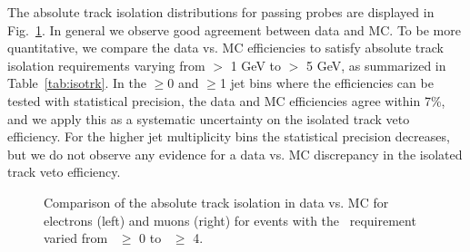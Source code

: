 The absolute track isolation distributions for passing probes are displayed in Fig.~\ref{fig:tnp}. In general we observe
good agreement between data and MC. To be more quantitative, we compare the data vs. MC efficiencies to satisfy
absolute track isolation requirements varying from $>$ 1 GeV to $>$ 5 GeV, as summarized in Table~\ref{tab:isotrk}.
In the $\geq$0 and $\geq$1 jet bins where the efficiencies can be tested with statistical precision, the data and MC
efficiencies agree within 7\%, and we apply this as a systematic uncertainty on the isolated track veto efficiency.
For the higher jet multiplicity bins the statistical precision decreases, but we do not observe any evidence for
a data vs. MC discrepancy in the isolated track veto efficiency.



\begin{figure}[hbt]
  \begin{center}
	\caption{
	  \label{fig:tnp} Comparison of the absolute track isolation in data vs. MC for electrons (left) and muons (right)
for events with the \njets\ requirement varied from \njets\ $\geq$ 0 to \njets\ $\geq$ 4. 
}  
      \end{center}
\end{figure}

\clearpage

